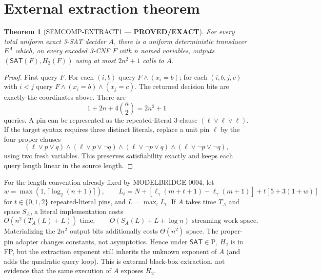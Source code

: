 \documentclass[11pt]{article}
\newtheorem{theorem}{Theorem}
\newcommand{\SAT}{\mathsf{SAT}}
\newcommand{\status}[1]{\textbf{#1}}
\begin{document}
\section{External extraction theorem}
\begin{theorem}[SEMCOMP-EXTRACT1 --- \status{PROVED/EXACT}]
For every total uniform exact 3-SAT decider $A$, there is a uniform deterministic transducer $E^A$ which, on every encoded 3-CNF $F$ with $n$ named variables, outputs $(\SAT(F),H_2(F))$ using at most $2n^2+1$ calls to $A$.
\end{theorem}
\begin{proof}
First query $F$.  For each $(i,b)$ query $F\wedge(x_i=b)$; for each $(i,b,j,c)$ with $i<j$ query $F\wedge(x_i=b)\wedge(x_j=c)$.  The returned decision bits are exactly the coordinates above.  There are
\[
1+2n+4\binom n2=2n^2+1
\]
queries.  A pin can be represented as the repeated-literal 3-clause $(\ell\vee\ell\vee\ell)$.  If the target syntax requires three distinct literals, replace a unit pin $\ell$ by the four proper clauses
\[
(\ell\vee p\vee q)\wedge(\ell\vee p\vee\neg q)
\wedge(\ell\vee\neg p\vee q)\wedge(\ell\vee\neg p\vee\neg q),
\]
using two fresh variables.  This preserves satisfiability exactly and keeps each query length linear in the source length.
\end{proof}

For the length convention already fixed by MODELBRIDGE-0004, let
\[
w=\max(1,\lceil\log_2(n+1)\rceil),\qquad
L_t=N+[\ell_\gamma(m+t+1)-\ell_\gamma(m+1)]+t[5+3(1+w)]
\]
for $t\in\{0,1,2\}$ repeated-literal pins, and $L=\max_t L_t$.  If $A$ takes time $T_A$ and space $S_A$, a literal implementation costs
\[
O\!\left(n^2(T_A(L)+L)\right)\text{ time},\qquad
O(S_A(L)+L+\log n)\text{ streaming work space}.
\]
Materializing the $2n^2$ output bits additionally costs $\Theta(n^2)$ space.  The proper-pin adapter changes constants, not asymptotics.  Hence under $\SAT\in\mathrm P$, $H_2$ is in FP, but the extraction exponent still inherits the unknown exponent of $A$ (and adds the quadratic query loop).  This is external black-box extraction, not evidence that the same execution of $A$ exposes $H_2$.
\end{document}
